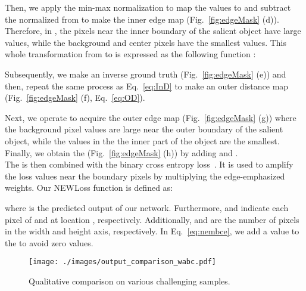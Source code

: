 \documentclass{article}
\begin{document}
\noindent Then, we apply the min-max normalization to map the values to  and subtract the normalized  from  to make the inner edge map  (Fig.~\ref{fig:edgeMask} (d)). Therefore, in , the pixels near the inner boundary of the salient object have large values, while the background and center pixels have the smallest values. This whole transformation from  to  is expressed as the following function :
    \vspace{-0.15cm}
	

Subsequently, we make an inverse ground truth  (Fig.~\ref{fig:edgeMask} (e)) and then, repeat the same process as Eq.~\ref{eq:InD} to make an outer distance map  (Fig.~\ref{fig:edgeMask} (f), Eq.~\ref{eq:OD}). 
    
	
\noindent Next, we operate  to acquire the outer edge map  (Fig.~\ref{fig:edgeMask} (g)) where the background pixel values are large near the outer boundary of the salient object, while the values in the the inner part of the object are the smallest. Finally, we obtain the  (Fig.~\ref{fig:edgeMask} (h)) by adding  and . \\
\indent The  is then combined with the binary cross entropy loss~\cite{de2005tutorial}. It is used to amplify the loss values near the boundary pixels by multiplying the edge-emphasized weights. Our NEWLoss function is defined as:
    \vspace{-0.15cm}
    
    \vspace{-0.3cm}
    
    






\vspace{-0.1cm}
\noindent where  is the predicted output of our network. Furthermore,  and  indicate each pixel of  and  at location , respectively. Additionally,  and  are the number of pixels in the width and height axis, respectively. In Eq.~\ref{eq:nembce}, we add a value  to the  to avoid zero values.

\begin{figure}[t]
\centering
      \centerline{\texttt{[image: ./images/output\_comparison\_wabc.pdf]}}
\vspace{-0.3cm}
    \caption{Qualitative comparison on various challenging samples.}
    \vspace{-0.3cm}
    \label{fig:output_compar}
\end{figure}

\vspace{-0.2cm}
\end{document}
